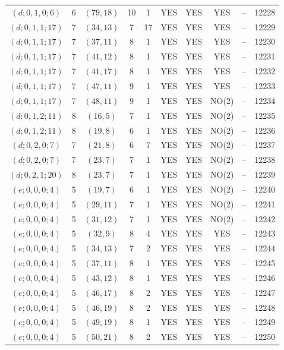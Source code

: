 \begin{longtable}{|c|c|c|c|c|c|c|c|c|c|}
$(d; 0, 1, 0; 6)$ & 6 & $(79, 18)$ & 10 & 1 & YES & YES & YES & -- & 12228\\
$(d; 0, 1, 1; 17)$ & 7 & $(34, 13)$ & 7 & 17 & YES & YES & YES & -- & 12229\\
$(d; 0, 1, 1; 17)$ & 7 & $(37, 11)$ & 8 & 1 & YES & YES & YES & -- & 12230\\
$(d; 0, 1, 1; 17)$ & 7 & $(41, 12)$ & 8 & 1 & YES & YES & YES & -- & 12231\\
$(d; 0, 1, 1; 17)$ & 7 & $(41, 17)$ & 8 & 1 & YES & YES & YES & -- & 12232\\
$(d; 0, 1, 1; 17)$ & 7 & $(47, 11)$ & 9 & 1 & YES & YES & YES & -- & 12233\\
$(d; 0, 1, 1; 17)$ & 7 & $(48, 11)$ & 9 & 1 & YES & YES & NO(2) & -- & 12234\\
$(d; 0, 1, 2; 11)$ & 8 & $(16, 5)$ & 7 & 1 & YES & YES & NO(2) & -- & 12235\\
$(d; 0, 1, 2; 11)$ & 8 & $(19, 8)$ & 6 & 1 & YES & YES & NO(2) & -- & 12236\\
$(d; 0, 2, 0; 7)$ & 7 & $(21, 8)$ & 6 & 7 & YES & YES & NO(2) & -- & 12237\\
$(d; 0, 2, 0; 7)$ & 7 & $(23, 7)$ & 7 & 1 & YES & YES & NO(2) & -- & 12238\\
$(d; 0, 2, 1; 20)$ & 8 & $(23, 7)$ & 7 & 1 & YES & YES & NO(2) & -- & 12239\\
$(e; 0, 0, 0; 4)$ & 5 & $(19, 7)$ & 6 & 1 & YES & YES & NO(2) & -- & 12240\\
$(e; 0, 0, 0; 4)$ & 5 & $(29, 11)$ & 7 & 1 & YES & YES & NO(2) & -- & 12241\\
$(e; 0, 0, 0; 4)$ & 5 & $(31, 12)$ & 7 & 1 & YES & YES & NO(2) & -- & 12242\\
$(e; 0, 0, 0; 4)$ & 5 & $(32, 9)$ & 8 & 4 & YES & YES & YES & -- & 12243\\
$(e; 0, 0, 0; 4)$ & 5 & $(34, 13)$ & 7 & 2 & YES & YES & YES & -- & 12244\\
$(e; 0, 0, 0; 4)$ & 5 & $(37, 11)$ & 8 & 1 & YES & YES & YES & -- & 12245\\
$(e; 0, 0, 0; 4)$ & 5 & $(43, 12)$ & 8 & 1 & YES & YES & YES & -- & 12246\\
$(e; 0, 0, 0; 4)$ & 5 & $(46, 17)$ & 8 & 2 & YES & YES & YES & -- & 12247\\
$(e; 0, 0, 0; 4)$ & 5 & $(46, 19)$ & 8 & 2 & YES & YES & YES & -- & 12248\\
$(e; 0, 0, 0; 4)$ & 5 & $(49, 19)$ & 8 & 1 & YES & YES & YES & -- & 12249\\
$(e; 0, 0, 0; 4)$ & 5 & $(50, 21)$ & 8 & 2 & YES & YES & YES & -- & 12250\\

\end{longtable}
